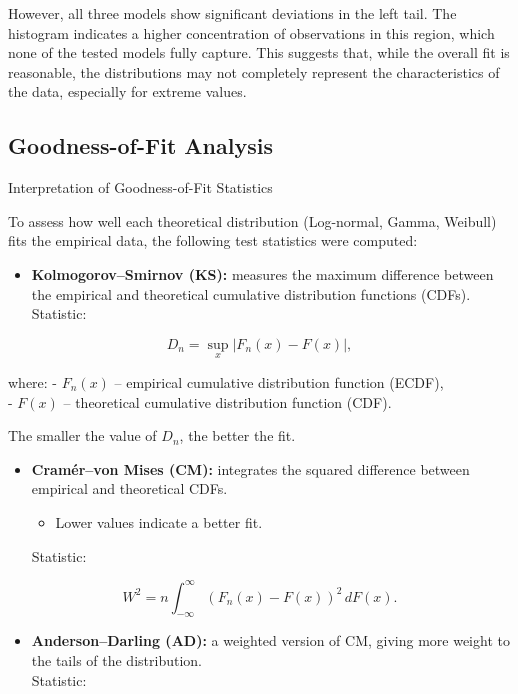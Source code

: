 \documentclass[
]{article}
\providecommand{\tightlist}{%
  \setlength{\itemsep}{0pt}\setlength{\parskip}{0pt}}
\begin{document}
However, all three models show significant deviations in the left tail.
The histogram indicates a higher concentration of observations in this
region, which none of the tested models fully capture. This suggests
that, while the overall fit is reasonable, the distributions may not
completely represent the characteristics of the data, especially for
extreme values.

\subsection{Goodness-of-Fit Analysis}\label{goodness-of-fit-analysis}

Interpretation of Goodness-of-Fit Statistics

To assess how well each theoretical distribution (Log-normal, Gamma,
Weibull) fits the empirical data, the following test statistics were
computed:

\begin{itemize}
\tightlist
\item
  \textbf{Kolmogorov--Smirnov (KS):} measures the maximum difference
  between the empirical and theoretical cumulative distribution
  functions (CDFs).\\
  Statistic:
\end{itemize}

\[
D_n = \sup_x |F_n(x) - F(x)|,
\]

where: - \(F_n(x)\) -- empirical cumulative distribution function
(ECDF),\\
- \(F(x)\) -- theoretical cumulative distribution function (CDF).

The smaller the value of \(D_n\), the better the fit.

\begin{itemize}
\tightlist
\item
  \textbf{Cramér--von Mises (CM):} integrates the squared difference
  between empirical and theoretical CDFs.

  \begin{itemize}
  \tightlist
  \item
    Lower values indicate a better fit.
  \end{itemize}

  Statistic:
\end{itemize}

\[
W^2 = n \int_{-\infty}^{\infty} (F_n(x) - F(x))^2 \, dF(x).
\]

\begin{itemize}
\tightlist
\item
  \textbf{Anderson--Darling (AD):} a weighted version of CM, giving more
  weight to the tails of the distribution.\\
  Statistic:
\end{itemize}
\end{document}
